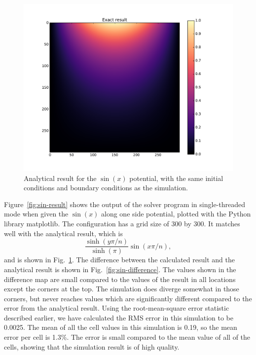 \begin{figure}[h!]
	\centering
	\includegraphics[width=1.1\linewidth]{sin300_exact.pdf}
	\caption{Analytical result for the $\sin(x)$ potential, with the same initial conditions and boundary conditions as the simulation.}
	\label{fig:sin-analytic}
	\end{figure}



Figure~\ref{fig:sin-result} shows the output of the solver program in single-threaded mode when given the $\sin(x)$ along one side
potential, plotted with the Python library matplotlib. The configuration has a grid size of 300 by 300. It matches well with the analytical result, which
is
$$\frac{\sinh(y \pi / n)}{\sinh(\pi)} \sin(x \pi / n),$$
and is shown in Fig.~\ref{fig:sin-analytic}. The difference between the calculated result and the
analytical result is shown in Fig.~\ref{fig:sin-difference}. The values shown in the difference map are small compared
to the values of the result in all locations except the corners at the top. The simulation does diverge somewhat in those corners, 
but never reaches values which are significantly different compared to the error from the analytical result. Using the root-mean-square error statistic
described earlier, we have calculated the RMS error in this simulation to be 0.0025. The mean of all the cell values in this
simulation is 0.19, so the mean error per cell is 1.3\%. The error is small compared to the mean value of all of the cells,
showing that the simulation result is of high quality.



